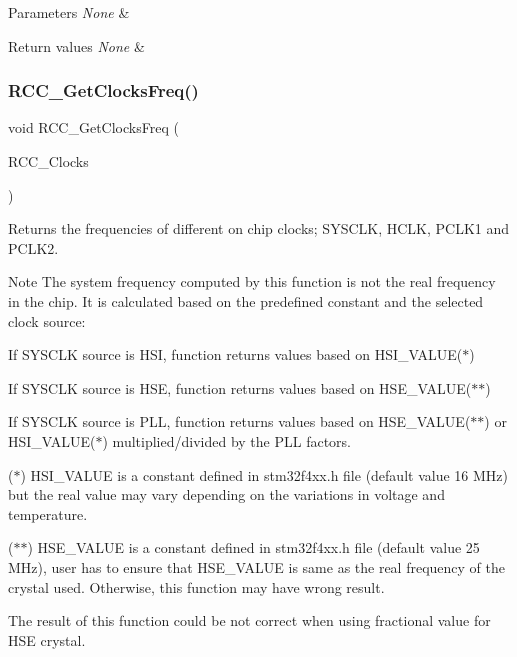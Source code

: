 \begin{DoxyParams}{Parameters}
{\em None} & \\
\hline
\end{DoxyParams}

\begin{DoxyRetVals}{Return values}
{\em None} & \\
\hline
\end{DoxyRetVals}
\mbox{\label{group___r_c_c_ga3e9944fd1ed734275222bbb3e3f29993}} 
\subsubsection{\texorpdfstring{R\+C\+C\+\_\+\+Get\+Clocks\+Freq()}{RCC\_GetClocksFreq()}}
{\footnotesize\ttfamily void R\+C\+C\+\_\+\+Get\+Clocks\+Freq (\begin{DoxyParamCaption}\item[{\mbox{\hyperlink{struct_r_c_c___clocks_type_def}{R\+C\+C\+\_\+\+Clocks\+Type\+Def}} $\ast$}]{R\+C\+C\+\_\+\+Clocks }\end{DoxyParamCaption})}



Returns the frequencies of different on chip clocks; S\+Y\+S\+C\+LK, H\+C\+LK, P\+C\+L\+K1 and P\+C\+L\+K2. 

\begin{DoxyNote}{Note}
The system frequency computed by this function is not the real frequency in the chip. It is calculated based on the predefined constant and the selected clock source\+: 

If S\+Y\+S\+C\+LK source is H\+SI, function returns values based on H\+S\+I\+\_\+\+V\+A\+L\+U\+E($\ast$) 

If S\+Y\+S\+C\+LK source is H\+SE, function returns values based on H\+S\+E\+\_\+\+V\+A\+L\+U\+E($\ast$$\ast$) 

If S\+Y\+S\+C\+LK source is P\+LL, function returns values based on H\+S\+E\+\_\+\+V\+A\+L\+U\+E($\ast$$\ast$) or H\+S\+I\+\_\+\+V\+A\+L\+U\+E($\ast$) multiplied/divided by the P\+LL factors. ~\newline


($\ast$) H\+S\+I\+\_\+\+V\+A\+L\+UE is a constant defined in stm32f4xx.\+h file (default value 16 M\+Hz) but the real value may vary depending on the variations in voltage and temperature. 

($\ast$$\ast$) H\+S\+E\+\_\+\+V\+A\+L\+UE is a constant defined in stm32f4xx.\+h file (default value 25 M\+Hz), user has to ensure that H\+S\+E\+\_\+\+V\+A\+L\+UE is same as the real frequency of the crystal used. Otherwise, this function may have wrong result.

The result of this function could be not correct when using fractional value for H\+SE crystal.
\end{DoxyNote}

